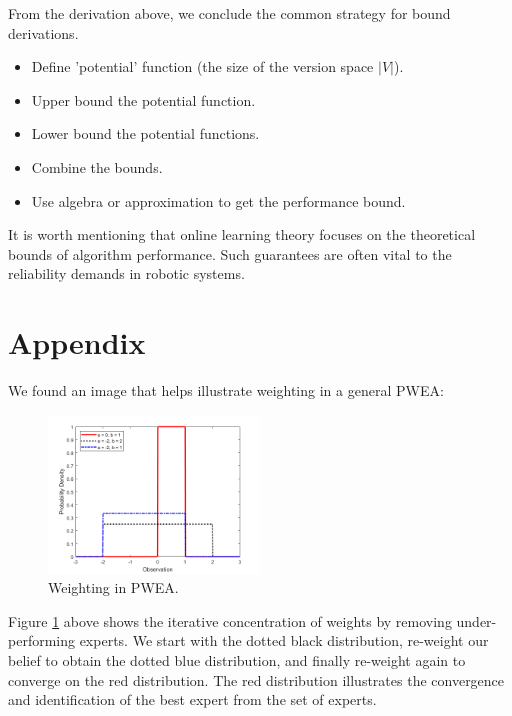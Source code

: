 \documentclass[11pt]{article}
\begin{document}
From the derivation above, we conclude the common strategy for bound derivations.
\begin{itemize}
    \item Define 'potential' function (the size of the version space $|V|$).
    \item Upper bound the potential function.
    \item Lower bound the potential functions.
    \item Combine the bounds.
    \item Use algebra or approximation to get the performance bound.
\end{itemize}

It is worth mentioning that online learning theory focuses on the theoretical bounds of algorithm performance. Such guarantees are often vital to the reliability demands in robotic systems.




\newpage
\section{Appendix}

We found an image that helps illustrate weighting in a general PWEA:
\begin{figure}[ht]
    \centering
    \includegraphics[width=0.5\textwidth]{ContinuousUniformDistributionPdfExample_01.png}
    \caption{Weighting in PWEA.}
    \label{fig:weighting}
\end{figure}

Figure \ref{fig:weighting} above shows the iterative concentration of weights by removing under-performing experts. We start with the dotted black distribution, re-weight our belief to obtain the dotted blue distribution, and finally re-weight again to converge on the red distribution. The red distribution illustrates the convergence and identification of the best expert from the set of experts.
\end{document}
